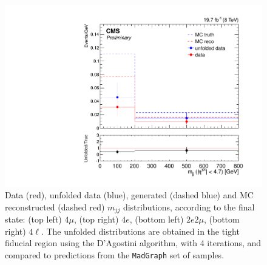 \begin{figure}[hbtp]
\begin{center}
    \includegraphics[width=\cmsFigWidth]{Figures/Mjj_ZZTo4l_Mad_fr}      
    \caption{\footnotesize{Data (red), unfolded data (blue), generated (dashed blue) and MC reconstructed (dashed red) $m_{jj}$ distributions, according to the final state: (top left) $4\mu$, (top right) $4e$, (bottom left) $2e2\mu$, (bottom right) $4\ell$. The unfolded distributions are obtained in the tight fiducial region using the D'Agostini algorithm, with 4 iterations, and compared to predictions from the \texttt{MadGraph} set of samples.}} 
    \label{fig:Mjj_unfolding}
  \end{center}
\end{figure}
